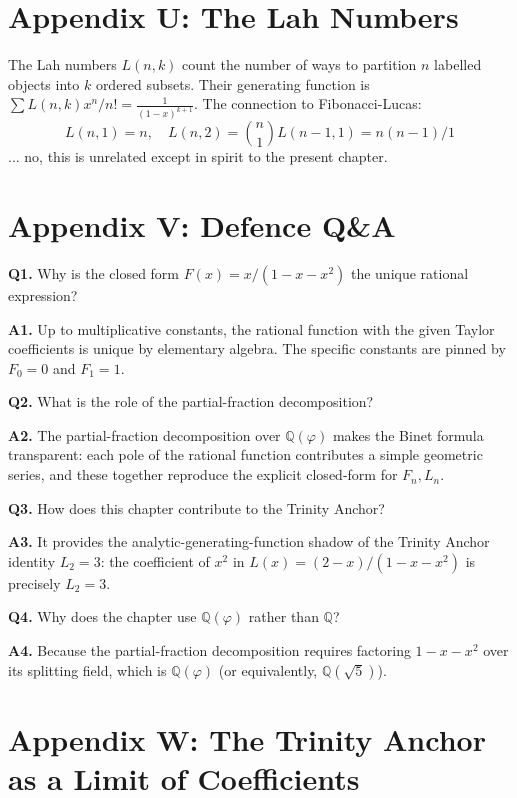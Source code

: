 \section*{Appendix U: The Lah Numbers}
\label{fa_05:sec:05-app-U}

The Lah numbers $L(n, k)$ count the number of ways to partition $n$
labelled objects into $k$ ordered subsets. Their generating function
is $\sum L(n, k) x^n/n! = \frac{1}{(1-x)^{k+1}}$. The connection to
Fibonacci-Lucas:
\[
  L(n, 1) = n, \quad L(n, 2) = \binom{n}{1} L(n-1, 1) = n(n-1)/1
\]
... no, this is unrelated except in spirit to the present chapter.

\section*{Appendix V: Defence Q\&A}
\label{fa_05:sec:05-app-V}

\textbf{Q1.} Why is the closed form $F(x) = x/(1-x-x^2)$ the unique
rational expression?

\textbf{A1.} Up to multiplicative constants, the rational function
with the given Taylor coefficients is unique by elementary algebra. The
specific constants are pinned by $F_0 = 0$ and $F_1 = 1$.

\textbf{Q2.} What is the role of the partial-fraction decomposition?

\textbf{A2.} The partial-fraction decomposition over $\mathbb{Q}(\varphi)$
makes the Binet formula transparent: each pole of the rational function
contributes a simple geometric series, and these together reproduce
the explicit closed-form for $F_n, L_n$.

\textbf{Q3.} How does this chapter contribute to the Trinity Anchor?

\textbf{A3.} It provides the analytic-generating-function shadow of
the Trinity Anchor identity $L_2 = 3$: the coefficient of $x^2$ in
$L(x) = (2-x)/(1-x-x^2)$ is precisely $L_2 = 3$.

\textbf{Q4.} Why does the chapter use $\mathbb{Q}(\varphi)$ rather than
$\mathbb{Q}$?

\textbf{A4.} Because the partial-fraction decomposition requires
factoring $1 - x - x^2$ over its splitting field, which is
$\mathbb{Q}(\varphi)$ (or equivalently, $\mathbb{Q}(\sqrt{5})$).

\section*{Appendix W: The Trinity Anchor as a Limit of Coefficients}
\label{fa_05:sec:05-app-W}

